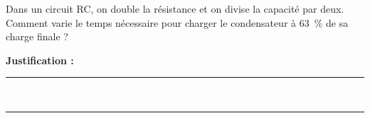 Dans un circuit RC, on double la résistance et on divise la capacité par deux. Comment varie le temps nécessaire pour charger le condensateur à \qty{63}{\percent} de sa charge finale ?

\choices

\noindent\textbf{Justification :} \hrulefill \\[2.5ex]
\rule{\linewidth}{0.4pt} \\[2.5ex]
\rule{\linewidth}{0.4pt}
\vfill
